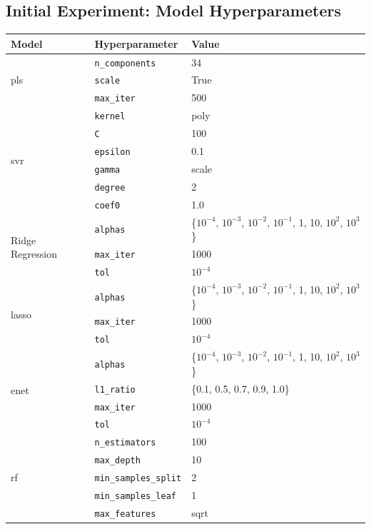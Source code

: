 \subsection{Initial Experiment: Model Hyperparameters}\label{subsec:initial_experiment_hyperparameters}
\begin{table}
\centering
\begin{tabular}{@{}llp{}@{}}
\toprule
\textbf{Model} & \textbf{Hyperparameter} & \textbf{Value} \\
\midrule
\multirow{3}{*}{\gls{pls}}
& \texttt{n\_components} & 34 \\
& \texttt{scale} & True \\
& \texttt{max\_iter} & 500 \\
\midrule
\multirow{6}{*}{\gls{svr}}
& \texttt{kernel} & poly \\
& \texttt{C} & 100 \\
& \texttt{epsilon} & 0.1 \\
& \texttt{gamma} & scale \\
& \texttt{degree} & 2 \\
& \texttt{coef0} & 1.0 \\
\midrule
\multirow{3}{*}{Ridge Regression}
& \texttt{alphas} & \{$10^{-4}$, $10^{-3}$, $10^{-2}$, $10^{-1}$, 1, 10, $10^2$, $10^3$\} \\
& \texttt{max\_iter} & 1000 \\
& \texttt{tol} & $10^{-4}$ \\
\midrule
\multirow{3}{*}{\gls{lasso}}
& \texttt{alphas} & \{$10^{-4}$, $10^{-3}$, $10^{-2}$, $10^{-1}$, 1, 10, $10^2$, $10^3$\} \\
& \texttt{max\_iter} & 1000 \\
& \texttt{tol} & $10^{-4}$ \\
\midrule
\multirow{4}{*}{\gls{enet}}
& \texttt{alphas} & \{$10^{-4}$, $10^{-3}$, $10^{-2}$, $10^{-1}$, 1, 10, $10^2$, $10^3$\} \\
& \texttt{l1\_ratio} & \{0.1, 0.5, 0.7, 0.9, 1.0\} \\
& \texttt{max\_iter} & 1000 \\
& \texttt{tol} & $10^{-4}$ \\
\midrule
\multirow{6}{*}{\gls{rf}}
& \texttt{n\_estimators} & 100 \\
& \texttt{max\_depth} & 10 \\
& \texttt{min\_samples\_split} & 2 \\
& \texttt{min\_samples\_leaf} & 1 \\
& \texttt{max\_features} & sqrt \\

\end{tabular}
\end{table}
